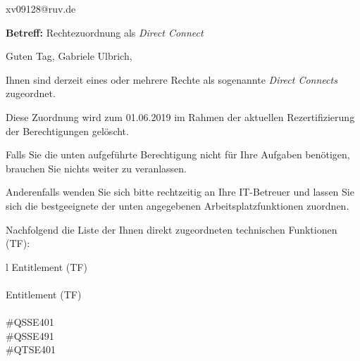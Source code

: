 \documentclass[a4paper,landscape,12pt]{letter}
\begin{document}
\begin{letter}{xv09128@ruv.de\hfill \break}
\begin{normalsize}
	\opening{\textbf{Betreff:} Rechtezuordnung als \emph{Direct Connect}}
	\begin{normalsize} \hfill
	\end{normalsize}

	\begin{normalsize}
		Guten Tag, 
	Gabriele Ulbrich, \hfill \break
	\end{normalsize}
	\end{normalsize}
	
\begin{normalsize}
	Ihnen sind derzeit eines oder mehrere Rechte als sogenannte \emph{Direct Connects} zugeordnet.
	
	Diese Zuordnung wird zum 01.06.2019 im Rahmen der aktuellen Rezertifizierung der Berechtigungen gelöscht.
	
	Falls Sie die unten aufgeführte Berechtigung nicht für Ihre Aufgaben benötigen, 
	brauchen Sie nichts weiter zu veranlassen.
	
	Anderenfalls wenden Sie sich bitte rechtzeitig an Ihre IT-Betreuer 
	und lassen Sie sich die bestgeeignete der unten angegebenen Arbeitsplatzfunktionen zuordnen.
	\end{normalsize}
	
\begin{normalsize}
	Nachfolgend die Liste der Ihnen direkt zugeordneten technischen Funktionen (TF):

	\begin{longtable}{l}
		Entitlement (TF) \\ \hline
		\endfirsthead
		\\\hline
		Entitlement (TF) \\ \hline
		\endhead %
		\multicolumn{1}{r@{}}{Fortsetzung \ldots}\\
		\endfoot
		\hline
		\endlastfoot
	\#QSSE401\\\#QSSE491\\\#QTSE401\\
	\end{longtable}
	\end{normalsize}
	

\end{letter}
\end{document}
